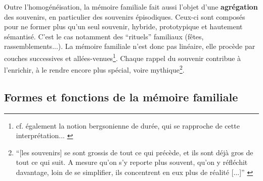 \documentclass[french]{article}
\begin{document}
			Outre l'homogénéisation, la mémoire familiale fait aussi l'objet d'une \textbf{agrégation} des souvenirs, en particulier des souvenirs épisodiques. Ceux-ci sont composés pour ne former plus qu'un seul souvenir, hybride, prototypique et hautement sémantisé. C'est le cas notamment des ``rituels'' familiaux (fêtes, rassemblements...). La mémoire familiale n'est donc pas linéaire, elle procède par couches successives et allées-venues\footnote{cf. également la notion bergsonienne de durée, qui se rapproche de cette interprétation... \cite[p.~5]{bergson1908}}. Chaque rappel du souvenir contribue à l'enrichir, à le rendre encore plus spécial, voire mythique\footnote{``[les souvenirs] se sont grossis de tout ce qui précède, et ils sont déjà gros de tout ce qui suit. A mesure qu'on s'y reporte plus souvent, qu'on y réfléchit davantage, loin de se simplifier, ils concentrent en eux plus de réalité [...]'' \cite[p.~114]{halbwachs1925}}.

		\subsection{Formes et fonctions de la mémoire familiale}\label{formefonc}
\end{document}
